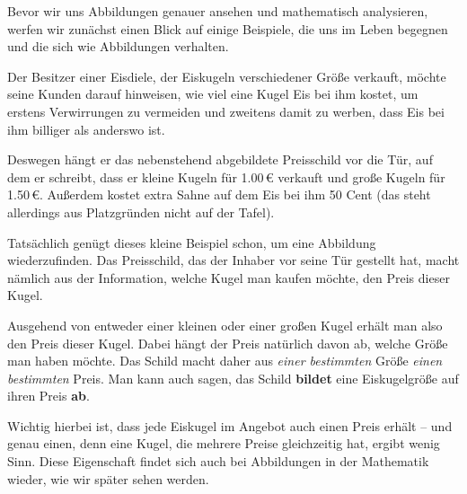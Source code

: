 \documentclass[../../main.tex]{subfiles}
\begin{document}
Bevor wir uns Abbildungen genauer ansehen und mathematisch analysieren, werfen wir zunächst einen Blick auf einige Beispiele, die uns im Leben begegnen und die sich wie Abbildungen verhalten.

\begin{example}{}
    Der Besitzer einer Eisdiele, der Eiskugeln verschiedener Größe verkauft, möchte seine Kunden darauf hinweisen, wie viel eine Kugel Eis bei ihm kostet, um erstens Verwirrungen zu vermeiden und zweitens damit zu werben, dass Eis bei ihm billiger als anderswo ist.
    
    Deswegen hängt er das nebenstehend abgebildete Preisschild vor die Tür, auf dem er schreibt, dass er kleine Kugeln für 1.00\,\euro{} verkauft und große Kugeln für 1.50\,\euro. Außerdem kostet extra Sahne auf dem Eis bei ihm 50 Cent (das steht allerdings aus Platzgründen nicht auf der Tafel).
    
    Tatsächlich genügt dieses kleine Beispiel schon, um eine Abbildung wiederzufinden. Das Preisschild, das der Inhaber vor seine Tür gestellt hat, macht nämlich aus der Information, welche Kugel man kaufen möchte, den Preis dieser Kugel.
    
    Ausgehend von entweder einer kleinen oder einer großen Kugel erhält man also den Preis dieser Kugel. Dabei hängt der Preis natürlich davon ab, welche Größe man haben möchte. Das Schild macht daher aus \emph{einer bestimmten} Größe \emph{einen bestimmten} Preis. Man kann auch sagen, das Schild \textbf{bildet} eine Eiskugelgröße auf ihren Preis \textbf{ab}. 
    
    Wichtig hierbei ist, dass jede Eiskugel im Angebot auch einen Preis erhält -- und genau einen, denn eine Kugel, die mehrere Preise gleichzeitig hat, ergibt wenig Sinn. Diese Eigenschaft findet sich auch bei Abbildungen in der Mathematik wieder, wie wir später sehen werden.
\end{example}
\end{document}
